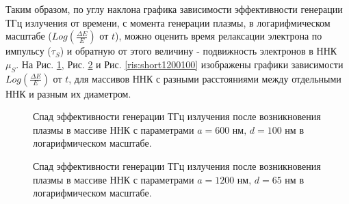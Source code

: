 \documentclass[a4paper,14pt,russian]{extreport}
\begin{document}
				Таким образом, по углу наклона графика зависимости эффективности генерации ТГц излучения от времени, с момента генерации плазмы, в логарифмическом масштабе ($Log\left(\frac{\Delta E}{E}\right)$ от $t$), можно оценить время релаксации электрона по импульсу ($\tau_S$) и обратную от этого величину - подвижность электронов в ННК $\mu_S$. На Рис. \ref{ris:shortLog600100}, Рис. \ref{ris:shortLog120065} и Рис. \ref{ris:short1200100} изображены графики зависимости $Log\left(\frac{\Delta E}{E}\right)$ от $t$, для массивов ННК с разными расстояниями между отдельными ННК и разным их диаметром.\par
				\begin{figure}[h]
					\caption{Спад эффективности генерации ТГц излучения после возникновения плазмы в массиве ННК с параметрами $a = 600 \text{ нм, } d = 100 \text{ нм}$ в логарифмическом масштабе.}
				\label{ris:shortLog600100}
				\end{figure}
				\begin{figure}[h]
					\caption{Спад эффективности генерации ТГц излучения после возникновения плазмы в массиве ННК с параметрами $a = 1200 \text{ нм, } d = 65 \text{ нм}$ в логарифмическом масштабе.}
				\label{ris:shortLog120065}
				\end{figure}
\end{document}
